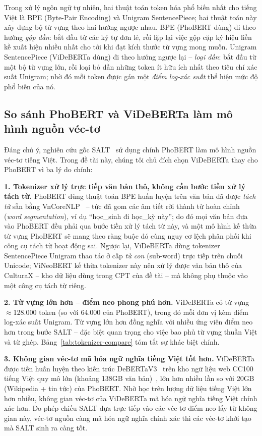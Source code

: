 Trong xử lý ngôn ngữ tự nhiên, hai thuật toán token hóa phổ biến nhất cho tiếng Việt là BPE
(Byte-Pair Encoding) và Unigram SentencePiece; hai thuật toán này xây dựng bộ từ vựng theo
hai hướng ngược nhau. BPE (PhoBERT dùng) đi theo hướng \textit{gộp dần}: bắt đầu từ các ký
tự đơn lẻ, rồi lặp lại việc gộp cặp ký hiệu liền kề xuất hiện nhiều nhất cho tới khi đạt
kích thước từ vựng mong muốn. Unigram SentencePiece (ViDeBERTa dùng) đi theo hướng ngược
lại -- \textit{loại dần}: bắt đầu từ một bộ từ vựng lớn, rồi loại bỏ dần những token ít
hữu ích nhất theo tiêu chí xác suất Unigram; nhờ đó mỗi token được gán một \textit{điểm
log-xác suất} thể hiện mức độ phổ biến của nó.

\subsection{So sánh PhoBERT và ViDeBERTa làm mô hình nguồn véc-tơ}
\label{subsec:donor-compare}

Đáng chú ý, nghiên cứu gốc SALT~\cite{lee2025salt} sử dụng chính PhoBERT làm mô hình nguồn véc-tơ tiếng Việt. Trong đề tài này, chúng tôi chủ đích chọn ViDeBERTa thay cho PhoBERT vì ba
lý do chính:

\textbf{1. Tokenizer xử lý trực tiếp văn bản thô, không cần bước tiền xử lý tách từ.}
PhoBERT dùng thuật toán BPE huấn luyện trên văn bản đã được \textit{tách từ} sẵn bằng
VnCoreNLP~\cite{vu2018vncorenlp} -- tức đã gom các âm tiết rời thành từ hoàn chỉnh
(\textit{word segmentation}), ví dụ ``học\_sinh đi học\_kỳ này''; do đó mọi văn bản đưa
vào PhoBERT đều phải qua bước tiền xử lý tách từ này, và một mô hình kế thừa từ vựng PhoBERT
sẽ mang theo ràng buộc đó cùng nguy cơ lệch phân phối khi công cụ tách từ hoạt động sai.
Ngược lại, ViDeBERTa dùng tokenizer SentencePiece Unigram thao tác ở cấp \textit{từ
con} (sub-word) trực tiếp trên chuỗi Unicode; ViNeoBERT kế thừa tokenizer này nên xử lý
được văn bản thô của CulturaX -- kho dữ liệu dùng trong CPT của đề tài -- mà không phụ
thuộc vào một công cụ tách từ riêng.

\textbf{2. Từ vựng lớn hơn -- điểm neo phong phú hơn.} ViDeBERTa có từ vựng $\approx$128.000
token (so với 64.000 của PhoBERT), trong đó mỗi đơn vị kèm điểm log-xác suất Unigram.
Từ vựng lớn hơn đồng nghĩa với nhiều ứng viên điểm neo hơn trong bước SALT -- đặc biệt quan
trọng cho việc bao phủ từ vựng thuần Việt và từ ghép. Bảng~\ref{tab:tokenizer-compare}
tóm tắt sự khác biệt chính.

\textbf{3. Không gian véc-tơ mã hóa ngữ nghĩa tiếng Việt tốt hơn.} ViDeBERTa được tiền huấn
luyện theo kiến trúc DeBERTaV3~\cite{he2021deberta} trên kho ngữ liệu web CC100 tiếng Việt
quy mô lớn (khoảng 138GB văn bản)~\cite{lai2023videberta}, lớn hơn nhiều lần so với 20GB
(Wikipedia + tin tức) của PhoBERT. Nhờ học trên lượng dữ liệu tiếng Việt lớn hơn nhiều, không
gian véc-tơ của ViDeBERTa mã hóa ngữ nghĩa tiếng Việt chính xác hơn. Do phép chiếu SALT dựa
trực tiếp vào các véc-tơ điểm neo lấy từ không gian này, véc-tơ nguồn càng mã hóa ngữ nghĩa
chính xác thì các véc-tơ khởi tạo mà SALT sinh ra càng tốt.

